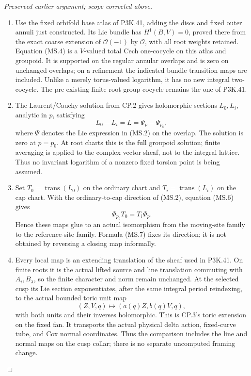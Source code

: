 \begin{proof}[Preserved earlier argument; scope corrected above]
\begin{enumerate}[label=\arabic*.]
\par

\medskip\noindent\textbf{MS.3. The actual global family comparison}

\par\nobreak

\item Use the fixed orbifold base atlas of P3K.41, adding the discs and fixed
outer annuli just constructed. Its Lie bundle has
\(H^1(B,V)=0\), proved there from the exact coarse extension of
\(\mathcal O(-1)\) by \(\mathcal O\), with all root weights
retained. Equation (MS.4) is a \(V\)-valued total Cech one-cocycle
on this atlas and groupoid. It is supported on the regular annular
overlaps and is zero on unchanged overlaps; on a refinement the
indicated bundle transition maps are included. Unlike a merely
torus-valued logarithm, it has no new integral two-cocycle. The
pre-existing finite-root group cocycle remains the one of P3K.41.

\item The Laurent/Cauchy solution from CP.2 gives holomorphic sections
\(L_0,L_i\), analytic in \(p\), satisfying
\[
                    L_0-L_i=L=\Psi_p-\Psi_{p_0},          \tag{MS.6}
\]
where \(\Psi\) denotes the Lie expression in (MS.2) on the
overlap. The solution is zero at \(p=p_0\). At root charts this
is the full groupoid solution; finite averaging is applied to the
complex vector sheaf, not to the integral lattice. Thus no invariant
logarithm of a nonzero fixed torsion point is being assumed.

\item Set \(T_0=\operatorname{trans}(L_0)\) on the ordinary chart and
\(T_i=\operatorname{trans}(L_i)\) on the cap chart. With the
ordinary-to-cap direction of (MS.2), equation (MS.6) gives
\[
                  \Phi_{p_0}T_0=T_i\Phi_p.                \tag{MS.7}
\]
Hence these maps glue to an actual isomorphism from the moving-site
family to the reference-site family. Formula (MS.7) fixes its direction;
it is not obtained by reversing a closing map informally.

\item Every local map is an extending translation of the sheaf used in
P3K.41. On finite roots it is the actual lifted source and line
translation commuting with \(A_i,B_\lambda\), so the finite
character and norm remain unchanged. At the selected cusp its Lie
section exponentiates, after the same integral period reindexing, to
the actual bounded toric unit map
\[
                 (Z,V,q)\longmapsto(a(q)Z,b(q)V,q),       \tag{MS.8}
\]
with both units and their inverses holomorphic. This is CP.3's
toric extension on the fixed fan. It transports the actual physical
delta action, fixed-curve tube, and Cox normal coordinates. Thus the
comparison includes the line and normal maps on the cusp collar;
there is no separate uncomputed framing change.


\end{enumerate}
\end{proof}
